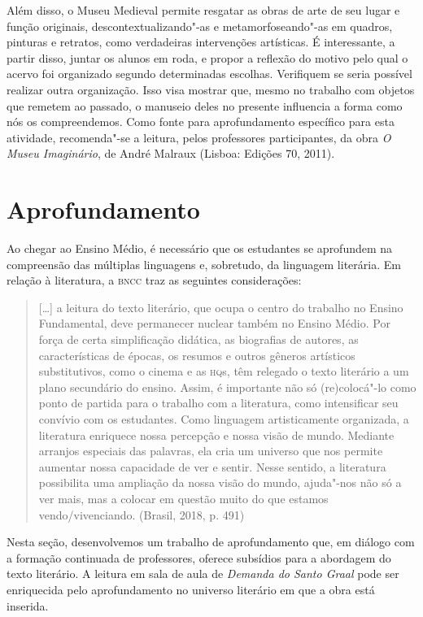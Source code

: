 \documentclass[11pt]{extarticle}
\begin{document}
Além disso, o Museu Medieval permite resgatar as obras de arte de seu
lugar e função originais, descontextualizando"-as e metamorfoseando"-as em
quadros, pinturas e retratos, como verdadeiras intervenções artísticas.
É interessante, a partir disso, juntar os alunos em roda, e propor a
reflexão do motivo pelo qual o acervo foi organizado segundo
determinadas escolhas. Verifiquem se seria possível realizar outra
organização. Isso visa mostrar que, mesmo no trabalho com objetos que
remetem ao passado, o manuseio deles no presente influencia a forma como
nós os compreendemos. Como fonte para aprofundamento específico para
esta atividade, recomenda"-se a leitura, pelos professores participantes,
da obra \emph{O Museu Imaginário}, de André Malraux (Lisboa: Edições 70,
2011).

\section{Aprofundamento}

Ao chegar ao Ensino Médio, é necessário que os estudantes se aprofundem
na compreensão das múltiplas linguagens e, sobretudo, da linguagem
literária. Em relação à literatura, a \textsc{bncc} traz as seguintes
considerações:

\begin{quote}
{[}\ldots{}{]} a leitura do texto literário, que ocupa o centro do trabalho
no Ensino Fundamental, deve permanecer nuclear também no Ensino Médio.
Por força de certa simplificação didática, as biografias de autores, as
características de épocas, os resumos e outros gêneros artísticos
substitutivos, como o cinema e as \textsc{hq}s, têm relegado o texto literário a
um plano secundário do ensino. Assim, é importante não só (re)colocá"-lo
como ponto de partida para o trabalho com a literatura, como
intensificar seu convívio com os estudantes. Como linguagem
artisticamente organizada, a literatura enriquece nossa percepção e
nossa visão de mundo. Mediante arranjos especiais das palavras, ela cria
um universo que nos permite aumentar nossa capacidade de ver e sentir.
Nesse sentido, a literatura possibilita uma ampliação da nossa visão do
mundo, ajuda"-nos não só a ver mais, mas a colocar em questão muito do
que estamos vendo/vivenciando. (Brasil, 2018, p. 491)
\end{quote}

Nesta seção, desenvolvemos um trabalho de aprofundamento que, em diálogo
com a formação continuada de professores, oferece subsídios para a
abordagem do texto literário. A leitura em sala de aula de \emph{Demanda
do Santo Graal} pode ser enriquecida pelo aprofundamento no universo
literário em que a obra está inserida.
\end{document}

